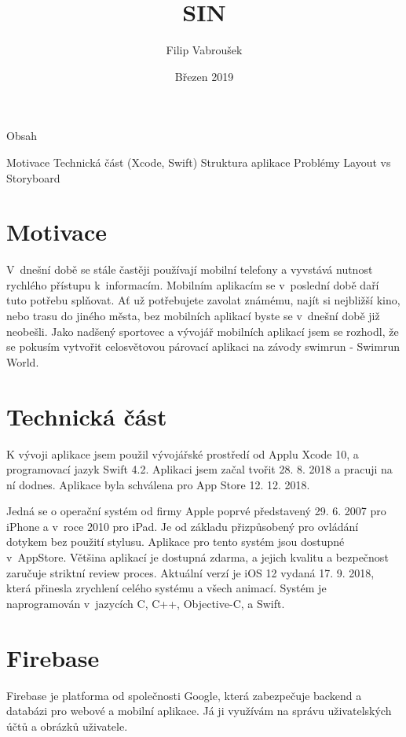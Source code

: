 \documentclass{article}
\title{SIN}
\author{Filip Vabroušek }
\date{Březen 2019}
\begin{document}
\maketitle

Obsah

Motivace \hfill \break
Technická část (Xcode, Swift)  \hfill \break
Struktura aplikace  \hfill \break
Problémy  \hfill \break
Layout vs Storyboard  \hfill \break
\vspace{10 mm}

\section{Motivace}

	V dnešní době se stále častěji používají mobilní telefony a vyvstává nutnost rychlého  přístupu k informacím. Mobilním aplikacím se v poslední době daří tuto potřebu splňovat. Ať už potřebujete zavolat známému, najít si nejbližší kino, nebo trasu do jiného města, bez mobilních aplikací byste se v dnešní době již neobešli. Jako nadšený sportovec a vývojář mobilních aplikací jsem se rozhodl, že se pokusím vytvořit celosvětovou párovací aplikaci na závody swimrun - Swimrun World.


\vspace{10 mm}
\section{Technická část}

K vývoji aplikace jsem použil vývojářské prostředí od Applu Xcode 10, a programovací jazyk Swift 4.2. Aplikaci jsem začal tvořit 28. 8. 2018 a pracuji na ní dodnes. Aplikace byla schválena pro App Store 12. 12. 2018. 


\vspace{10 mm}

	Jedná se o operační systém od firmy Apple poprvé představený 29. 6. 2007 pro iPhone a v roce 2010 pro iPad.  Je od základu přizpůsobený pro ovládání dotykem bez použití stylusu. Aplikace pro tento systém jsou dostupné v AppStore. Většina aplikací je dostupná zdarma, a jejich kvalitu a bezpečnost zaručuje striktní review proces. Aktuální verzí je iOS 12 vydaná 17. 9. 2018, která přinesla zrychlení celého systému a všech animací. Systém je naprogramován v jazycích C, C++, Objective-C, a Swift.

\vspace{10 mm}

\section{Firebase}
	Firebase je platforma od společnosti Google, která zabezpečuje backend a databázi pro webové a mobilní aplikace. Já ji využívám na správu uživatelských účtů a obrázků uživatele.
\end{document}

